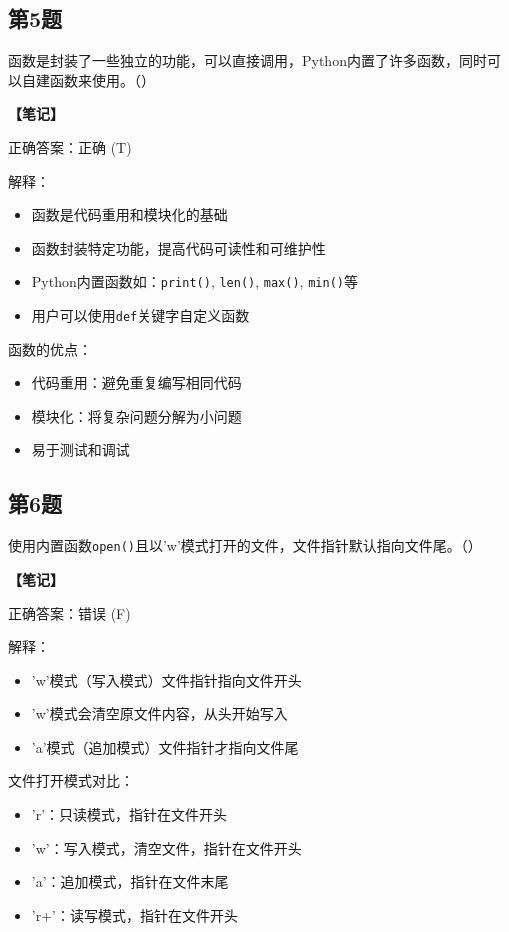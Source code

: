 \subsection{第5题}
函数是封装了一些独立的功能，可以直接调用，Python内置了许多函数，同时可以自建函数来使用。（\quad）

\begin{mdframed}[linewidth=1pt, linecolor=black]
  \textbf{\color{red}【笔记】}

  正确答案：正确 (T)

  解释：
  \begin{itemize}
    \item 函数是代码重用和模块化的基础
    \item 函数封装特定功能，提高代码可读性和可维护性
    \item Python内置函数如：\texttt{print()}, \texttt{len()}, \texttt{max()}, \texttt{min()}等
    \item 用户可以使用\texttt{def}关键字自定义函数
  \end{itemize}

  函数的优点：
  \begin{itemize}
    \item 代码重用：避免重复编写相同代码
    \item 模块化：将复杂问题分解为小问题
    \item 易于测试和调试
  \end{itemize}

\end{mdframed}

\subsection{第6题}
使用内置函数\texttt{open()}且以'w'模式打开的文件，文件指针默认指向文件尾。（\quad）

\begin{mdframed}[linewidth=1pt, linecolor=black]
  \textbf{\color{red}【笔记】}

  正确答案：错误 (F)

  解释：
  \begin{itemize}
    \item 'w'模式（写入模式）文件指针指向文件开头
    \item 'w'模式会清空原文件内容，从头开始写入
    \item 'a'模式（追加模式）文件指针才指向文件尾
  \end{itemize}

  文件打开模式对比：
  \begin{itemize}
    \item 'r'：只读模式，指针在文件开头
    \item 'w'：写入模式，清空文件，指针在文件开头
    \item 'a'：追加模式，指针在文件末尾
    \item 'r+'：读写模式，指针在文件开头
  \end{itemize}

\end{mdframed}

